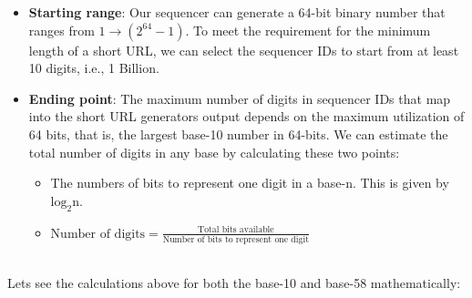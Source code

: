 \begin{itemize}
\item
\protect{}\label{FJ-NvfVgX12OQxfwAmtc1}
\textbf{Starting range}: Our sequencer can generate a 64-bit binary number that ranges from \protect{}\label{katex_inline_VEz18Prvv5fLfzFVJSWKJ}{{{\(1 \to (2^{64}-1)\)}}}. To meet the requirement for the minimum length of a short URL, we can select the sequencer IDs to start from at least 10 digits, i.e., 1 Billion.
\item
\protect{}\label{6ZVz4i1y0TgflehgXT9Pp}
\textbf{Ending point}: The maximum number of digits in sequencer IDs that map into the short URL generator\textquotesingle s output depends on the maximum utilization of 64 bits, that is, the largest base-10 number in 64-bits. We can estimate the total number of digits in any base by calculating these two points:

\begin{itemize}
\item
\protect{}\label{L5VSSX8hP9mwHA8MYC9d4}
The numbers of bits to represent one digit in a base-n. This is given by \protect{}\label{katex_inline_37rCZ7S8_p1uAQ-GkRmuA}{{{\(\text{log}_2{\text{n}}\)}}}.
\item
\protect{}\label{Ln-JC7gFtNtURGE9_WJ88}
\protect{}\label{katex_inline_dSEPWFDSyJ8ZzAXR7RCye}{{{\(\text{Number of digits} = \frac{\text{Total bits available}}{\text{Number of bits to represent one digit}}\)}}}
\end{itemize}
\end{itemize}
\\
Let\textquotesingle s see the calculations above for both the base-10 and base-58 mathematically:

